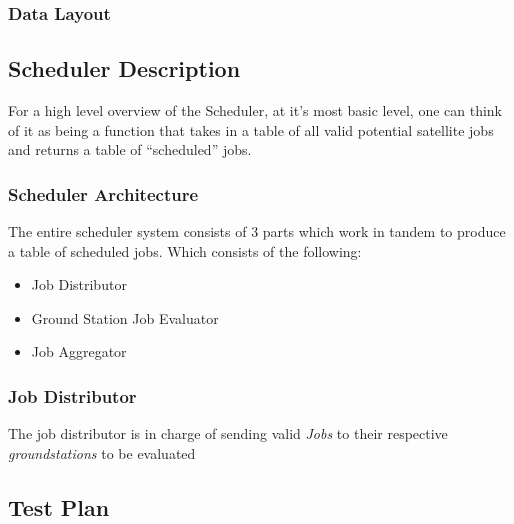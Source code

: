 \documentclass{article}
\begin{document}
\subsubsection{Data Layout}


\subsection{Scheduler Description}

For a high level overview of the Scheduler, at it's most basic level, one can
think of it as being a function that takes in a table of all valid potential
satellite jobs and returns a table of ``scheduled'' jobs.

\subsubsection{Scheduler Architecture}

The entire scheduler system consists of 3 parts which work in tandem to produce
a table of scheduled jobs. Which consists of the following:

\begin{itemize}
\item Job Distributor
\item Ground Station Job Evaluator
\item Job Aggregator
\end{itemize}

\subsubsection{Job Distributor}

The job distributor is in charge of sending valid \textit{Jobs} to their
respective \textit{groundstations} to be evaluated 

\subsection{Test Plan}
\end{document}
